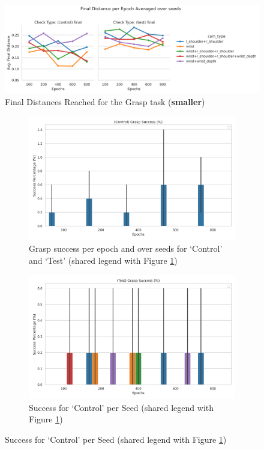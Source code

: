 \begin{figure}[htpb]
  \centering
  \includegraphics[width=\linewidth]{assets/evaluation/baseline/base-grasp-final-smaller.png}
  \caption{Final Distances Reached for the Grasp task (\textbf{smaller})}\label{fig:base-grasp-final-smaller}
\end{figure}

\begin{figure}[htpb]
  \centering
  \begin{subfigure}{0.45\linewidth}
    \centering
    \includegraphics[width=\linewidth]{assets/evaluation/baseline/base-smaller-grasp-control-success-cams-epochs.png}
    \caption{Grasp success per epoch and over seeds for `Control' and `Test' (shared legend with Figure \ref{fig:base-grasp-final-smaller})}\label{subfig:base-grasp-control-success-smaller}
  \end{subfigure}
  \hfill
  \begin{subfigure}{0.45\linewidth}
    \centering
    \includegraphics[width=\linewidth]{assets/evaluation/baseline/base-smaller-grasp-test-success-cams-epochs.png}
    \caption{Success for `Control' per Seed (shared legend with Figure \ref{fig:base-grasp-final-smaller})}\label{subfig:base-grasp-test-success-smaller}
  \end{subfigure}
  

\end{figure}
